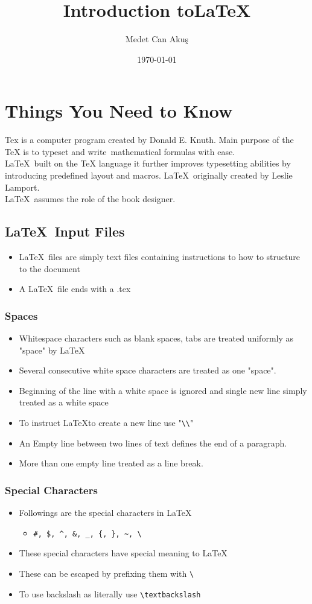 \documentclass{article}
\title{Introduction to\LaTeX }
\author{Medet Can Akuş}
\date{\today}
\begin{document}
\maketitle
\section{Things You Need to Know}
Tex is a computer program created by Donald E. Knuth. Main purpose of the TeX is to typeset and write\
mathematical formulas with ease. \\
\LaTeX\ built on the TeX language it further improves typesetting abilities by introducing predefined layout and macros.
\LaTeX\ originally created by Leslie Lamport.\\
\LaTeX\ assumes the role of the book designer.
\subsection{\LaTeX\ Input Files}
\begin{itemize}
    \item \LaTeX\ files are simply text files containing instructions to how to structure to the document
    \item A \LaTeX\ file ends with a .tex 
\end{itemize}
\subsubsection{Spaces}
\begin{itemize}
    \item Whitespace characters such as blank spaces, tabs are treated uniformly as "space" by \LaTeX\
    \item Several consecutive white space characters are treated as one "space".
    \item Beginning of the line with a white space is ignored and single new line simply treated as a white space
    \item To instruct \LaTeX to create a new line use "\verb|\\|"
    \item An Empty line between two lines of text defines the end of a paragraph.
    \item More than one empty line treated as a line break.
\end{itemize}
\newpage
\subsubsection{Special Characters}
\begin{itemize}
    \item Followings are the special characters in \LaTeX\
    \begin{itemize}
        \item \verb|#, $, ^, &, _, {, }, ~, \|
    \end{itemize}
    \item These special characters have special meaning to \LaTeX\
    \item These can be escaped by prefixing them with \verb|\|
    \item To use backslash as literally use \verb|\textbackslash|
\end{itemize}
\end{document}
